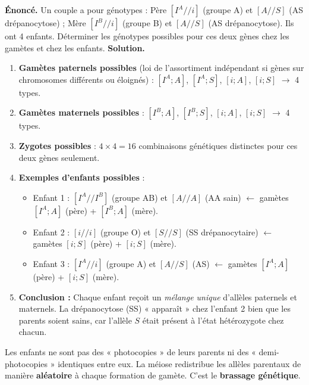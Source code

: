 \documentclass[11pt]{article}
\begin{document}
\begin{exoresolu}
\textbf{Énoncé.} Un couple a pour génotypes : Père $[I^A//i]$ (groupe A) et $[A//S]$ (AS drépanocytose) ; Mère $[I^B//i]$ (groupe B) et $[A//S]$ (AS drépanocytose). Ils ont 4 enfants. Déterminer les génotypes possibles pour ces deux gènes chez les gamètes et chez les enfants.
\tcblower
\textbf{Solution.}
\begin{enumerate}
    \item \textbf{Gamètes paternels possibles} (loi de l'assortiment indépendant si gènes sur chromosomes différents ou éloignés) : 
    $[I^A; A]$, $[I^A; S]$, $[i; A]$, $[i; S]$ $\rightarrow$ 4 types.
    \item \textbf{Gamètes maternels possibles} : 
    $[I^B; A]$, $[I^B; S]$, $[i; A]$, $[i; S]$ $\rightarrow$ 4 types.
    \item \textbf{Zygotes possibles} : $4 \times 4 = 16$ combinaisons génétiques distinctes pour ces deux gènes seulement.
    \item \textbf{Exemples d'enfants possibles} :
    \begin{itemize}
        \item Enfant 1 : $[I^A//I^B]$ (groupe AB) et $[A//A]$ (AA sain) $\leftarrow$ gamètes $[I^A;A]$ (père) + $[I^B;A]$ (mère).
        \item Enfant 2 : $[i//i]$ (groupe O) et $[S//S]$ (SS drépanocytaire) $\leftarrow$ gamètes $[i;S]$ (père) + $[i;S]$ (mère).
        \item Enfant 3 : $[I^A//i]$ (groupe A) et $[A//S]$ (AS) $\leftarrow$ gamètes $[I^A;A]$ (père) + $[i;S]$ (mère).
    \end{itemize}
    \item \textbf{Conclusion :} Chaque enfant reçoit un \emph{mélange unique} d'allèles paternels et maternels. La drépanocytose (SS) « apparaît » chez l'enfant 2 bien que les parents soient sains, car l'allèle $S$ était présent à l'état hétérozygote chez chacun.
\end{enumerate}
\end{exoresolu}

\begin{aretenir}[Interprétation]
Les enfants ne sont pas des « photocopies » de leurs parents ni des « demi-photocopies » identiques entre eux. La méiose redistribue les allèles parentaux de manière \textbf{aléatoire} à chaque formation de gamète. C'est le \textbf{brassage génétique}.
\end{aretenir}
\end{document}
